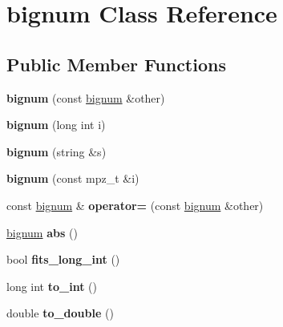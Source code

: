 \hypertarget{classbignum}{\section{bignum \-Class \-Reference}
\label{classbignum}
}
\subsection*{\-Public \-Member \-Functions}
\begin{DoxyCompactItemize}
\item 
\hypertarget{classbignum_a16c979dcf13417ef6d07123a53664a71}{{\bfseries bignum} (const \hyperlink{classbignum}{bignum} \&other)}\label{classbignum_a16c979dcf13417ef6d07123a53664a71}

\item 
\hypertarget{classbignum_a433de3a42d6200ee42f600bc22552e64}{{\bfseries bignum} (long int i)}\label{classbignum_a433de3a42d6200ee42f600bc22552e64}

\item 
\hypertarget{classbignum_a977eeaee38dbadfd95a9b695714eb4bb}{{\bfseries bignum} (string \&s)}\label{classbignum_a977eeaee38dbadfd95a9b695714eb4bb}

\item 
\hypertarget{classbignum_a5d7254a0767e9aa15d720527caa31d54}{{\bfseries bignum} (const mpz\-\_\-t \&i)}\label{classbignum_a5d7254a0767e9aa15d720527caa31d54}

\item 
\hypertarget{classbignum_ac39efc8fa7c73a1c8c30524ed010e8cb}{const \hyperlink{classbignum}{bignum} \& {\bfseries operator=} (const \hyperlink{classbignum}{bignum} \&other)}\label{classbignum_ac39efc8fa7c73a1c8c30524ed010e8cb}

\item 
\hypertarget{classbignum_ad63321215406159227c662a6ef8daf43}{\hyperlink{classbignum}{bignum} {\bfseries abs} ()}\label{classbignum_ad63321215406159227c662a6ef8daf43}

\item 
\hypertarget{classbignum_ad009bb299f786740933a7eec56642fb3}{bool {\bfseries fits\-\_\-long\-\_\-int} ()}\label{classbignum_ad009bb299f786740933a7eec56642fb3}

\item 
\hypertarget{classbignum_a6a3c9d38bf3a8ce6ba28118e901686c6}{long int {\bfseries to\-\_\-int} ()}\label{classbignum_a6a3c9d38bf3a8ce6ba28118e901686c6}

\item 
\hypertarget{classbignum_a4b44045470c3fbb7c99812edafc740a6}{double {\bfseries to\-\_\-double} ()}\label{classbignum_a4b44045470c3fbb7c99812edafc740a6}


\end{DoxyCompactItemize}
